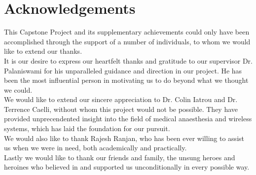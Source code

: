 \chapter*{Acknowledgements}

This Capstone Project and its supplementary achievements could only have been accomplished through the support of a number of individuals, to whom we would like to extend our thanks. \\

It is our desire to express our heartfelt thanks and gratitude to our supervisor Dr. Palaniswami for his unparalleled guidance and direction in our project. He has been the most influential person in motivating us to do beyond what we thought we could. \\

We would like to extend our sincere appreciation to Dr. Colin Iatrou and Dr. Terrence Caelli, without whom this project would not be possible. They have provided unprecendented insight into the field of medical anaesthesia and wireless systems, which has laid the foundation for our pursuit. \\

We would also like to thank Rajesh Ranjan, who has been ever willing to assist us when we were in need, both academically and practically. \\

Lastly we would like to thank our friends and family, the unsung heroes and heroines who believed in and supported us unconditionally in every possible way. \\
